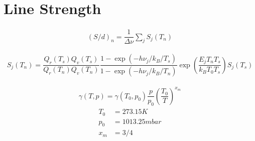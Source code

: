 \section{Line Strength}

\begin{align}
	\left(S/d\right)_n  = \dfrac{1}{\Delta \nu} \sum_j S_j(T_n)
\end{align}

\begin{align}
	S_j(T_n)  = \dfrac{Q_r(T_s) Q_v(T_s)}{Q_r(T_n) Q_v(T_n)} \dfrac{1 - \exp(-h \nu_j / k_B/T_s)}{1 - \exp(-h \nu_j / k_B/T_n)}
		\exp\left(\dfrac{E_j T_n T_s}{k_B T_0 T_s}\right) S_j(T_s)
\end{align}

\begin{align}
	\gamma(T,p) = \gamma(T_0,p_0) \dfrac{p}{p_0} \left(\dfrac{T_0}{T}\right)^{x_m}
\end{align}
\begin{align}
	T_0 &= 273.15 K \\
	p_0 &= 1013.25 mbar \\
	x_m &= 3/4
\end{align}

